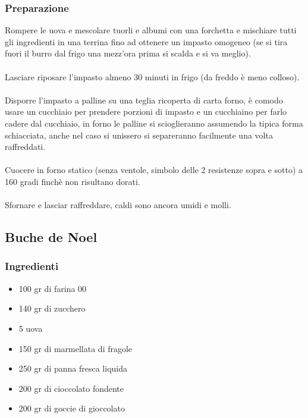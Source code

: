 \documentclass[12pt, a4paper]{article}
\begin{document}
\subsubsection{Preparazione}
	Rompere le uova e mescolare tuorli e albumi con una forchetta e
	mischiare tutti gli ingredienti in una terrina fino ad ottenere un 
	impasto omogeneo (se si tira fuori il burro dal frigo una mezz'ora prima 
	si scalda e si va meglio).\\\\
	Lasciare riposare l'impasto almeno 30 minuti in frigo (da freddo è
	meno colloso).\\\\
	Disporre l'impasto a palline su una teglia ricoperta di carta forno,
	è comodo usare un cucchiaio per prendere porzioni di impasto e un
	cucchiaino per farlo cadere dal cucchiaio, in forno le palline si
	scioglieranno assumendo la tipica forma schiacciata, anche nel caso
	si unissero si separeranno facilmente una volta raffreddati.\\\\
	Cuocere in forno statico (senza ventole, simbolo delle 2 resistenze
	sopra e sotto) a 160 gradi finchè non risultano dorati.\\\\
	Sfornare e lasciar raffreddare, caldi sono ancora umidi e molli.
\clearpage

\subsection{Buche de Noel}

\subsubsection{Ingredienti}
\begin{itemize}
\item   100 gr di farina 00
\item	140 gr di zucchero
\item	5 uova
\item	150 gr di marmellata di fragole
\item	250 gr di panna fresca liquida
\item	200 gr di cioccolato fondente
\item	200 gr di goccie di gioccolato
\end{itemize}

\clearpage
\end{document}
